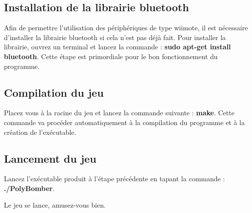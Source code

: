 \subsection{Installation de la librairie bluetooth}
	Afin de permettre l'utilisation des périphériques de type wiimote, il est nécessaire d'installer la librairie bluetooth si cela n'est pas déjà fait. Pour installer la librairie, ouvrez un terminal et lancez la commande : \textbf{sudo apt-get install bluetooth}. Cette étape est primordiale pour le bon fonctionnement du programme.
	

\subsection{Compilation du jeu}
	Placez vous à la racine du jeu et lancez la commande suivante : \textbf{make}.
Cette commande va procéder automatiquement à la compilation du programme et à la création de l'exécutable.


\subsection{Lancement du jeu}
	Lancez l'exécutable produit à l'étape précédente en tapant la commande : \textbf{./PolyBomber}.
	
	
\begin{center}	
	Le jeu se lance, amusez-vous bien.
\end{center}
	

